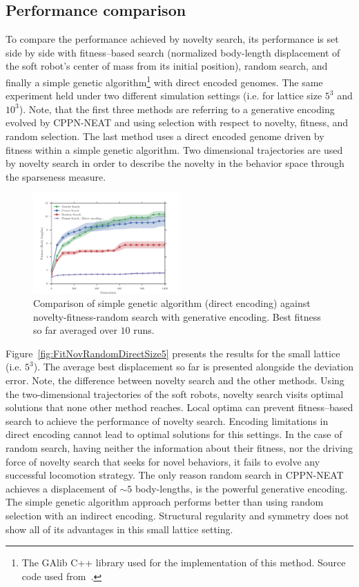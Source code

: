 \documentclass{sig-alternate}
\begin{document}
\subsection{Performance comparison}
To compare the performance achieved by novelty search, its performance is set side by side with fitness--based search (normalized body-length displacement of the soft robot's center of mass from its initial position), random search, and finally a simple genetic algorithm\footnote{The GAlib C++ library \cite{wall1996galib} used for the implementation of this method. Source code used from~\cite{cheney2013unshackling}.} with direct encoded genomes. The same experiment held under two different simulation settings (i.e. for lattice size $5^3$ and $10^3$). Note, that the first three methods are referring to a generative encoding evolved by CPPN-NEAT and using selection with respect to novelty, fitness, and random selection. The last method uses a direct encoded genome driven by fitness within a simple genetic algorithm. Two dimensional trajectories are used by novelty search in order to describe the novelty in the behavior space through the sparseness measure.

\begin{figure}[t!]
\centering
\includegraphics[width=0.5\textwidth]{../Figures/Results/FitvsNovVsDirSize10.pdf}
\caption{Comparison of simple genetic algorithm (direct encoding) against novelty-fitness-random search with generative encoding. Best fitness so far averaged over $10$ runs.}
\label{fig:FitvsNovVsDirSize10}
\end{figure} 

Figure~\ref{fig:FitNovRandomDirectSize5} presents the results for the small lattice (i.e. $5^3$). The average best displacement so far is presented alongside the deviation error. Note, the difference between novelty search and the other methods. Using the two-dimensional trajectories of the soft robots, novelty search visits optimal solutions that none other method reaches. Local optima can prevent fitness--based search to achieve the performance of novelty search. Encoding limitations in direct encoding cannot lead to optimal solutions for this settings. In the case of random search, having neither the information about their fitness, nor the driving force of novelty search that seeks for novel behaviors, it fails to evolve any successful locomotion strategy. The only reason random search in CPPN-NEAT achieves a displacement of $\sim 5$ body-lengths, is the powerful generative encoding. The simple genetic algorithm approach performs better than using random selection with an indirect encoding. Structural regularity and symmetry does not show all of its advantages in this small lattice setting.
\end{document}
